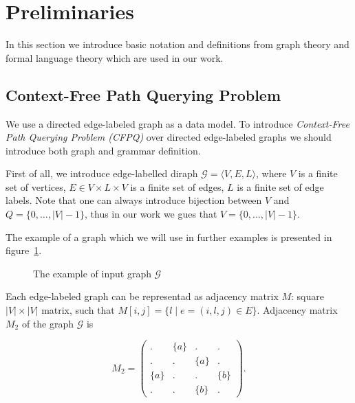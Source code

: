 \section{Preliminaries}

In this section we introduce basic notation and definitions from graph theory and formal language theory which are used in our work.

\subsection{Context-Free Path Querying Problem}

We use a directed edge-labeled graph as a data model. 
To introduce \textit{Context-Free Path Querying Problem (CFPQ)} over directed edge-labeled graphs we should introduce both graph and grammar definition.

First of all, we introduce edge-labelled diraph $\mathcal{G} = \langle V,E,L \rangle$, where $V$ is a finite set of vertices, $E \in V \times L \times V$ is a finite set of edges, $L$ is a finite set of edge labels. 
Note that one can always introduce bijection between $V$ and $Q = \{0, \ldots, |V|-1\}$, thus in our work we gues that $V = \{0, \ldots, |V|-1\}$.

The example of a graph which we will use in further examples is presented in figure~\ref{fig:example_input_graph}.

\begin{figure}[h]
    \centering        
    \caption{The example of input graph $\mathcal{G}$}
    \label{fig:example_input_graph}
\end{figure}

Each edge-labeled graph can be representad as adjacency matrix $M$: square $|V|\times|V|$ matrix, such that $M[i,j] = \{l \mid e = (i,l,j) \in E\}$.
Adjacency matrix $M_2$ of the graph $\mathcal{G}$ is 

$$
    M_2 =
    \begin{pmatrix}
    . & \{a\} & . & .     \\
    . & . & \{a\} & .     \\
    \{a\} & . & . & \{b\} \\
    . & . & \{b\} & .
    \end{pmatrix}.
$$

